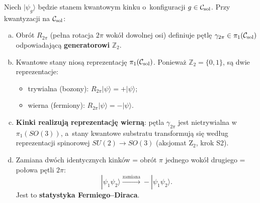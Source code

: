 \begin{corollary}%
\label{cor:fermions}
Niech $|\psi_g\rangle$ b\k{e}dzie stanem kwantowym
kinku o~konfiguracji $g \in \mathcal{C}_{\rm sol}$.
Przy kwantyzacji na $\mathcal{C}_{\rm sol}$:
\begin{enumerate}[(a),nosep]
  \item Obr\'ot $R_{2\pi}$ (pe\l{}na rotacja $2\pi$ wok\'o\l{} dowolnej osi)
        definiuje p\k{e}tl\k{e} $\gamma_{2\pi} \in \pi_1(\mathcal{C}_{\rm sol})$
        odpowiadaj\k{a}c\k{a} \textbf{generatorowi} $\mathbb{Z}_2$.
  \item Kwantowe stany nios\k{a} reprezentacj\k{e}
        $\pi_1(\mathcal{C}_{\rm sol})$. Poniewa\.z
        $\mathbb{Z}_2 = \{0, 1\}$, s\k{a} dwie reprezentacje:
        \begin{itemize}[nosep]
          \item trywialna (bozony): $R_{2\pi}|\psi\rangle = +|\psi\rangle$;
          \item wierna (fermiony): $R_{2\pi}|\psi\rangle = -|\psi\rangle$.
        \end{itemize}
  \item \textbf{Kinki realizuj\k{a} reprezentacj\k{e} wiern\k{a}}:
        p\k{e}tla $\gamma_{2\pi}$ jest nietrywialna
        w~$\pi_1(SO(3))$, a~stany kwantowe substratu
        transformuj\k{a} si\k{e} wed\l{}ug
        reprezentacji spinorowej $SU(2) \to SO(3)$
        (aksjomat Z$_2$, krok S2).
  \item Zamiana dw\'och identycznych kink\'ow = obr\'ot $\pi$ jednego
        wok\'o\l{} drugiego = po\l{}owa p\k{e}tli $2\pi$:
        \begin{equation}\label{eq:exchange-phase}
          |\psi_1 \psi_2\rangle
          \xrightarrow{\text{zamiana}}
          -|\psi_1 \psi_2\rangle.
        \end{equation}
        Jest to \textbf{statystyka Fermiego--Diraca}.
\end{enumerate}
\end{corollary}

